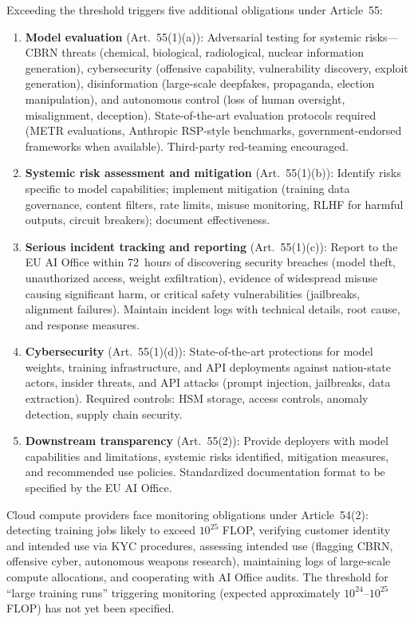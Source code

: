 \documentclass[11pt,a4paper]{article}
\begin{document}
Exceeding the threshold triggers five additional obligations under Article~55:
\begin{enumerate}
  \item \textbf{Model evaluation} (Art.~55(1)(a)): Adversarial testing for systemic risks---CBRN threats (chemical, biological, radiological, nuclear information generation), cybersecurity (offensive capability, vulnerability discovery, exploit generation), disinformation (large-scale deepfakes, propaganda, election manipulation), and autonomous control (loss of human oversight, misalignment, deception). State-of-the-art evaluation protocols required (METR evaluations, Anthropic RSP-style benchmarks, government-endorsed frameworks when available). Third-party red-teaming encouraged.
  \item \textbf{Systemic risk assessment and mitigation} (Art.~55(1)(b)): Identify risks specific to model capabilities; implement mitigation (training data governance, content filters, rate limits, misuse monitoring, RLHF for harmful outputs, circuit breakers); document effectiveness.
  \item \textbf{Serious incident tracking and reporting} (Art.~55(1)(c)): Report to the EU AI Office within 72~hours of discovering security breaches (model theft, unauthorized access, weight exfiltration), evidence of widespread misuse causing significant harm, or critical safety vulnerabilities (jailbreaks, alignment failures). Maintain incident logs with technical details, root cause, and response measures.
  \item \textbf{Cybersecurity} (Art.~55(1)(d)): State-of-the-art protections for model weights, training infrastructure, and API deployments against nation-state actors, insider threats, and API attacks (prompt injection, jailbreaks, data extraction). Required controls: HSM storage, access controls, anomaly detection, supply chain security.
  \item \textbf{Downstream transparency} (Art.~55(2)): Provide deployers with model capabilities and limitations, systemic risks identified, mitigation measures, and recommended use policies. Standardized documentation format to be specified by the EU AI Office.
\end{enumerate}

Cloud compute providers face monitoring obligations under Article~54(2): detecting training jobs likely to exceed $10^{25}$ FLOP, verifying customer identity and intended use via KYC procedures, assessing intended use (flagging CBRN, offensive cyber, autonomous weapons research), maintaining logs of large-scale compute allocations, and cooperating with AI Office audits. The threshold for ``large training runs'' triggering monitoring (expected approximately $10^{24}$--$10^{25}$ FLOP) has not yet been specified.
\end{document}
